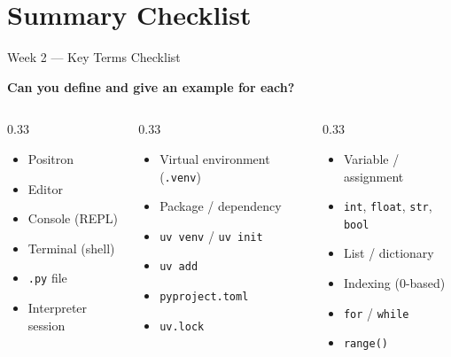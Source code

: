 \documentclass[9pt,aspectratio=169]{beamer}
\begin{document}
\section{Summary Checklist}

\begin{frame}{Week 2 --- Key Terms Checklist}

\textbf{Can you define and give an example for each?}

\medskip

\begin{columns}[T]
\begin{column}{0.33\textwidth}
\begin{itemize}
    \item Positron
    \item Editor
    \item Console (REPL)
    \item Terminal (shell)
    \item \texttt{.py} file
    \item Interpreter session
\end{itemize}
\end{column}
\begin{column}{0.33\textwidth}
\begin{itemize}
    \item Virtual environment (\texttt{.venv})
    \item Package / dependency
    \item \texttt{uv venv} / \texttt{uv init}
    \item \texttt{uv add}
    \item \texttt{pyproject.toml}
    \item \texttt{uv.lock}
\end{itemize}
\end{column}
\begin{column}{0.33\textwidth}
\begin{itemize}
    \item Variable / assignment
    \item \texttt{int}, \texttt{float}, \texttt{str}, \texttt{bool}
    \item List / dictionary
    \item Indexing (0-based)
    \item \texttt{for} / \texttt{while}
    \item \texttt{range()}
\end{itemize}
\end{column}
\end{columns}

\end{frame}
\end{document}
